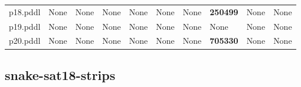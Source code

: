 \documentclass{article}
\begin{document}
\begin{tabular}{@{}lrrrrrrrrr@{}}
p18.pddl & \multicolumn{1}{|l|}{None} & \multicolumn{1}{|l|}{None} & \multicolumn{1}{|l|}{None} & \multicolumn{1}{|l|}{None} & \multicolumn{1}{|l|}{None} & \multicolumn{1}{|l|}{None} & \textbf{250499} & \multicolumn{1}{|l|}{None} & \multicolumn{1}{|l|}{None} \\
p19.pddl & \multicolumn{1}{|l|}{None} & \multicolumn{1}{|l|}{None} & \multicolumn{1}{|l|}{None} & \multicolumn{1}{|l|}{None} & \multicolumn{1}{|l|}{None} & \multicolumn{1}{|l|}{None} & \multicolumn{1}{|l|}{None} & \multicolumn{1}{|l|}{None} & \multicolumn{1}{|l|}{None} \\
p20.pddl & \multicolumn{1}{|l|}{None} & \multicolumn{1}{|l|}{None} & \multicolumn{1}{|l|}{None} & \multicolumn{1}{|l|}{None} & \multicolumn{1}{|l|}{None} & \multicolumn{1}{|l|}{None} & \textbf{705330} & \multicolumn{1}{|l|}{None} & \multicolumn{1}{|l|}{None} \\
\end{tabular}

\hypertarget{operators-snake-sat18-strips}{}
\subsection*{snake-sat18-strips}
\end{document}
